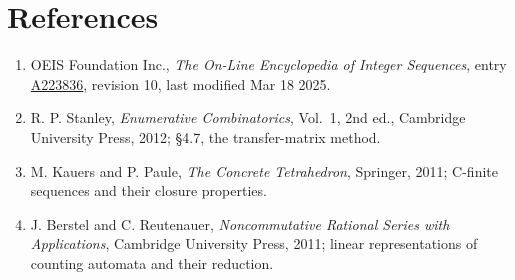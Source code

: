 \documentclass[11pt]{article}
\theoremstyle{definition}
\begin{document}
\section{References}

\begin{enumerate}

\item OEIS Foundation Inc., \emph{The On-Line Encyclopedia of Integer Sequences}, entry \href{https://oeis.org/A223836}{A223836}, revision 10, last modified Mar 18 2025.

\item R. P. Stanley, \emph{Enumerative Combinatorics}, Vol.~1, 2nd ed., Cambridge University Press, 2012; \S4.7, the transfer-matrix method.

\item M. Kauers and P. Paule, \emph{The Concrete Tetrahedron}, Springer, 2011; C-finite sequences and their closure properties.

\item J. Berstel and C. Reutenauer, \emph{Noncommutative Rational Series with Applications}, Cambridge University Press, 2011; linear representations of counting automata and their reduction.

\end{enumerate}
\end{document}
